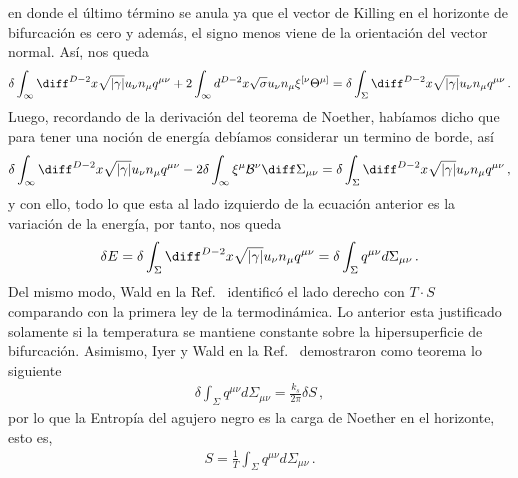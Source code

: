 \documentclass[../Main.tex]{subfiles}
\begin{document}
en donde el último término se anula ya que el vector de Killing en el horizonte de bifurcación es cero y además, el signo menos viene de la orientación del vector normal. Así, nos queda 
\begin{align}\notag
\delta \int_{\infty}  \diff^{D-2}x\sqrt{|\gamma|} u_\nu n_\mu q^{\mu \nu} +2 \int_{\infty} d^{D-2}x \sqrt{\sigma} u_\nu n_\mu \xi^{[\nu} \Theta^{\mu]}=\delta \int_{\Sigma}  \diff^{D-2}x\sqrt{|\gamma|} u_\nu n_\mu q^{\mu\nu}\, .
\end{align}
Luego, recordando de la derivación del teorema de Noether, habíamos dicho que para tener una noción de energía debíamos considerar un termino de borde, así 
\begin{align}
\delta \int_{\infty}  \diff^{D-2}x\sqrt{|\gamma|} u_\nu n_\mu q^{\mu \nu} -2 \delta\int_{\infty} \xi^{\mu}\mathcal{B}^{\nu}\diff\Sigma_{\mu\nu} =\delta \int_{\Sigma}  \diff^{D-2}x\sqrt{|\gamma|} u_\nu n_\mu q^{\mu\nu}\, ,
\end{align}
 y con ello, todo lo que esta al lado izquierdo de la ecuación anterior es la variación de la energía, por tanto, nos queda 
 \begin{align}
\delta E =\delta \int_{\Sigma} \diff^{D-2}x\sqrt{|\gamma|} u_\nu n_\mu q^{\mu\nu}=\delta \int_{\Sigma} q^{\mu\nu} d\Sigma_{\mu\nu}\, .
 \end{align}
Del mismo modo, Wald en la Ref.~\cite{Wald:1993nt} identificó el lado derecho con $T\cdot S$ comparando con la primera ley de la termodinámica. Lo anterior esta justificado solamente si la temperatura se mantiene constante sobre la hipersuperficie de bifurcación. Asimismo, Iyer y Wald en la Ref.~\cite{Iyer:1994ys} demostraron como teorema lo siguiente 
\begin{align}
\delta \int_{\Sigma} q^{\mu\nu} d\Sigma_{\mu\nu}=\frac{k_s}{2\pi}\delta S \, ,
\end{align}
por lo que la Entropía del agujero negro es la carga de Noether en el horizonte, esto es, 
\begin{align}
S=\frac{1}{T} \int_{\Sigma} q^{\mu\nu} d\Sigma_{\mu\nu}\, . \label{entropy}
\end{align}
\end{document}
